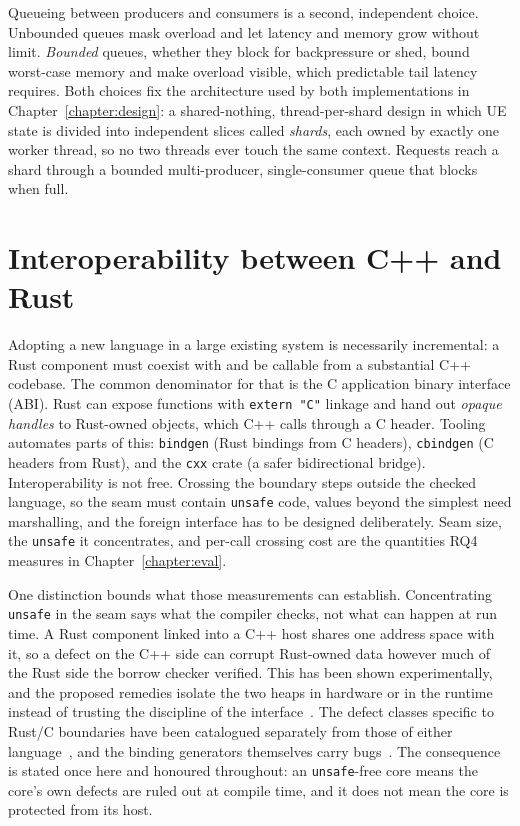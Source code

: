\documentclass[english,oneside,a4paper,censored,csm,software-track-2020]{HYthesisML}
\begin{document}
Queueing between producers and consumers is a second, independent choice. Unbounded queues mask
overload and let latency and memory grow without limit. \emph{Bounded} queues, whether they block
for backpressure or shed, bound worst-case memory and make overload visible, which predictable
tail latency requires. Both choices fix the architecture used by both implementations in
Chapter~\ref{chapter:design}: a shared-nothing, thread-per-shard design in which UE state is
divided into independent slices
called \emph{shards}, each owned by exactly one worker thread, so no two threads ever touch the
same context. Requests reach a shard through a bounded multi-producer, single-consumer queue that
blocks when full.

\section{Interoperability between C++ and Rust}\label{sec:interop}
Adopting a new language in a large existing system is necessarily incremental: a Rust component
must coexist with and be callable from a substantial C++ codebase. The common denominator for
that is the C application binary interface (ABI). Rust can expose functions with
\texttt{extern "C"} linkage and hand out \emph{opaque handles} to Rust-owned objects, which C++
calls through a C header. Tooling automates parts of this: \texttt{bindgen} (Rust bindings from
C headers), \texttt{cbindgen} (C headers from Rust), and the \texttt{cxx} crate (a safer
bidirectional bridge). Interoperability is not free. Crossing the boundary steps outside the
checked language, so the seam must contain \texttt{unsafe} code, values beyond the simplest need
marshalling, and the foreign interface has to be designed deliberately. Seam size, the
\texttt{unsafe} it concentrates, and per-call crossing cost are the quantities RQ4 measures in
Chapter~\ref{chapter:eval}.

One distinction bounds what those measurements can establish. Concentrating \texttt{unsafe} in
the seam says what the compiler checks, not what can happen at run time. A Rust component linked
into a C++ host shares one address space with it, so a defect on the C++ side can corrupt
Rust-owned data however much of the Rust side the borrow checker verified. This has been shown
experimentally, and the proposed remedies isolate the two heaps in hardware or in the runtime
instead of trusting the discipline of the
interface~\cite{rivera2021galeed,kirth2022pkrusafe}. The defect classes specific to Rust/C
boundaries have been catalogued separately from those of either
language~\cite{li2022crosslang}, and the binding generators themselves carry
bugs~\cite{cai2026interop}. The consequence is stated once here and honoured throughout: an
\texttt{unsafe}-free core means the core's own defects are ruled out at compile time, and it
does not mean the core is protected from its host.
\end{document}
